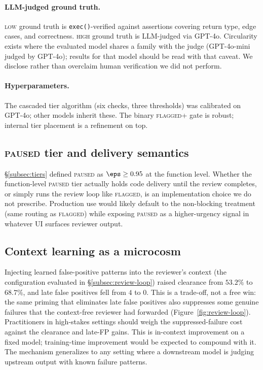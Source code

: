 \paragraph{LLM-judged ground truth.}\label{subsec:gt-disclosure}
\textsc{low} ground truth is \texttt{exec()}-verified against
assertions covering return type, edge cases, and correctness.
\textsc{high} ground truth is LLM-judged via GPT-4o. Circularity
exists where the evaluated model shares a family with the judge
(GPT-4o-mini judged by GPT-4o); results for that model should be
read with that caveat. We disclose rather than overclaim human
verification we did not perform.

\paragraph{Hyperparameters.} The cascaded tier algorithm (six
checks, three thresholds) was calibrated on GPT-4o; other models
inherit these. The binary \textsc{flagged+} gate is robust;
internal tier placement is a refinement on top.

\subsection{\textsc{paused} tier and delivery semantics}
\label{subsec:paused}

\S\ref{subsec:tiers} defined \textsc{paused} as $\eps \ge 0.95$
at the function level. Whether the function-level \textsc{paused}
tier actually holds code delivery until the review completes, or
simply runs the review loop like \textsc{flagged}, is an
implementation choice we do not prescribe. Production use would
likely default to the non-blocking treatment (same routing as
\textsc{flagged}) while exposing \textsc{paused} as a higher-urgency
signal in whatever UI surfaces reviewer output.

\subsection{Context learning as a microcosm}
\label{subsec:context}

Injecting learned false-positive patterns into the reviewer's
context (the configuration evaluated in \S\ref{subsec:review-loop})
raised clearance from $53.2\%$ to $68.7\%$, and late false positives
fell from $4$ to $0$. This is a trade-off, not a free win: the same
priming that eliminates late false positives also suppresses some
genuine failures that the context-free reviewer had forwarded
(Figure~\ref{fig:review-loop}). Practitioners in high-stakes
settings should weigh the suppressed-failure cost against the
clearance and late-FP gains. This is in-context improvement on a
fixed model; training-time improvement would be expected to compound
with it. The mechanism generalizes to any setting where a downstream
model is judging upstream output with known failure patterns.

